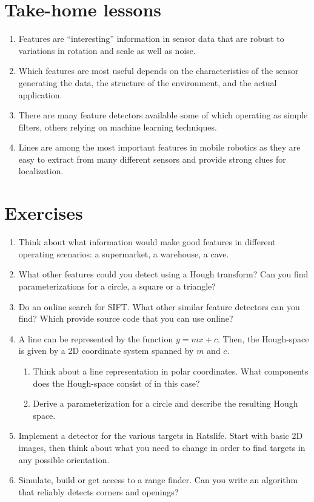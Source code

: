 \section*{Take-home lessons}
\begin{enumerate}
\item Features are ``interesting'' information in sensor data that are robust to variations in rotation and scale as well as noise.
\item Which features are most useful depends on the characteristics of the sensor generating the data, the structure of the environment, and the actual application.
\item There are many feature detectors available some of which operating as simple filters, others relying on machine learning techniques.
\item Lines are among the most important features in mobile robotics as they are easy to extract from many different sensors and provide strong clues for localization.
\end{enumerate}

\section*{Exercises}\small
\begin{enumerate}
\item Think about what information would make good features in different operating scenarios: a supermarket, a warehouse, a cave.
\item What other features could you detect using a Hough transform? Can you find parameterizations for a circle, a square or a triangle?
\item Do an online search for SIFT. What other similar feature detectors can you find? Which provide source code that you can use online?
\item A line can be represented by the function $y=mx+c$. Then, the Hough-space is given by a 2D coordinate system spanned by $m$ and $c$.\begin{enumerate}
\item Think about a line representation in polar coordinates. What components does the Hough-space consist of in this case?
\item Derive a parameterization for a circle and describe the resulting Hough space.
\end{enumerate}
\item Implement a detector for the various targets in Ratslife. Start with basic 2D images, then think about what you need to change in order to find targets in any possible orientation.
\item Simulate, build or get access to a range finder. Can you write an algorithm that reliably detects corners and openings?
\end{enumerate}
\normalsize
